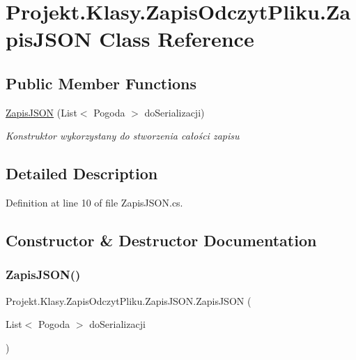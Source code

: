 \hypertarget{class_projekt_1_1_klasy_1_1_zapis_odczyt_pliku_1_1_zapis_j_s_o_n}{}\section{Projekt.\+Klasy.\+Zapis\+Odczyt\+Pliku.\+Zapis\+J\+S\+ON Class Reference}
\label{class_projekt_1_1_klasy_1_1_zapis_odczyt_pliku_1_1_zapis_j_s_o_n}
\subsection*{Public Member Functions}
\begin{DoxyCompactItemize}
\item 
\mbox{\hyperlink{class_projekt_1_1_klasy_1_1_zapis_odczyt_pliku_1_1_zapis_j_s_o_n_a805d26968a16bef7656687e6510a493e}{Zapis\+J\+S\+ON}} (List$<$ Pogoda $>$ do\+Serializacji)
\begin{DoxyCompactList}\small\item\em Konstruktor wykorzystany do stworzenia całości zapisu \end{DoxyCompactList}\end{DoxyCompactItemize}


\subsection{Detailed Description}


Definition at line 10 of file Zapis\+J\+S\+O\+N.\+cs.



\subsection{Constructor \& Destructor Documentation}
\mbox{\label{class_projekt_1_1_klasy_1_1_zapis_odczyt_pliku_1_1_zapis_j_s_o_n_a805d26968a16bef7656687e6510a493e}} 
\subsubsection{\texorpdfstring{ZapisJSON()}{ZapisJSON()}}
{\footnotesize\ttfamily Projekt.\+Klasy.\+Zapis\+Odczyt\+Pliku.\+Zapis\+J\+S\+O\+N.\+Zapis\+J\+S\+ON (\begin{DoxyParamCaption}\item[{List$<$ Pogoda $>$}]{do\+Serializacji }\end{DoxyParamCaption})}




